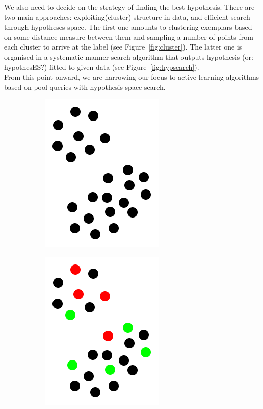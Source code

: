 \documentclass[12pt, a4paper, pdflatex, leqno, twoside]{report}
\begin{document}
We also need to decide on the strategy of finding the best hypothesis. 
There are two main approaches: exploiting(cluster) structure in data, and 
efficient search through hypotheses space. The first one amounts to
clustering exemplars based on some distance measure between them and sampling a 
number of points from each cluster to arrive at the label (see 
Figure~\ref{fig:cluster}). The latter one is organised in a systematic manner 
search algorithm that outputs hypothesis (or: hypothesES?) fitted to given data (see 
Figure~\ref{fig:hypsearch}).\\

From this point onward, we are narrowing our focus to active learning algorithms based on pool queries with hypothesis space search.\\

\begin{figure}[htbp]
\centering
  \begin{subfigure}[b]{0.3\textwidth}
    \centering
    \includegraphics[width=0.5\linewidth]{graphics/cluster1.png}
    \caption{\label{fig:cluster_a}}
  \end{subfigure}
  \begin{subfigure}[b]{0.3\textwidth}
    \centering
    \includegraphics[width=0.5\linewidth]{graphics/cluster2.png}

\end{subfigure}
\end{figure}
\end{document}
